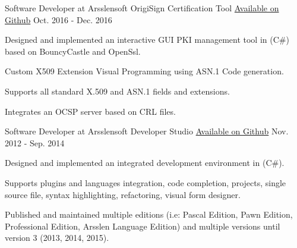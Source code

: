 
\begin{cventries}


  \cventry
    {Software Developer at Arsslensoft} %
    {OrigiSign Certification Tool} %
    {\href{https://github.com/Arsslensoft/OCT}{Available on Github}} %
    {Oct. 2016 - Dec. 2016} %
    {
      \begin{cvitems} %
	\item {Designed and implemented an interactive GUI PKI management tool in (C\#) based on BouncyCastle and OpenSsl.}
  \item {Custom X509 Extension Visual Programming using ASN.1 Code generation.}
  \item {Supports all standard X.509 and ASN.1 fields and extensions.}
  \item {Integrates an OCSP server based on CRL files.}
      \end{cvitems}
    }


  \cventry
    {Software Developer at Arsslensoft} %
    {Developer Studio} %
    {\href{https://github.com/Arsslensoft/Developer-Studio}{Available on Github}} %
    {Nov. 2012 - Sep. 2014} %
    {
      \begin{cvitems} %
	\item {Designed and implemented an integrated development environment in (C\#).}
  \item {Supports plugins and languages integration, code completion, projects, single source file, syntax highlighting, refactoring, visual form designer.}
  \item {Published and maintained multiple editions (i.e: Pascal Edition, Pawn Edition, Professional Edition, Arsslen Language Edition) and multiple versions until version 3 (2013, 2014, 2015).}
      \end{cvitems}
    }



\end{cventries}
